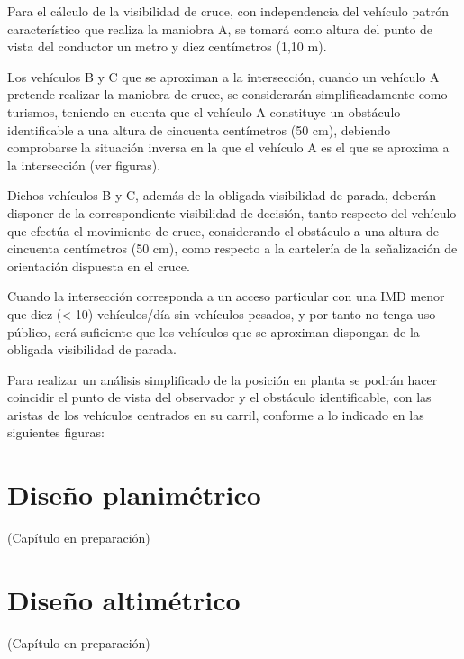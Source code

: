 \documentclass[letterpaper,10pt,english]{sphinxmanual}
\let\sphinxpxdimen\pdfpxdimen\else\newdimen\sphinxpxdimen
\begin{document}
Para el cálculo de la visibilidad de cruce, con independencia del vehículo patrón característico que realiza la maniobra A, se tomará como altura del punto de vista del conductor un metro y diez centímetros (1,10 m).

Los vehículos B y C que se aproximan a la intersección, cuando un vehículo A pretende realizar la maniobra de cruce, se considerarán simplificadamente como turismos, teniendo en cuenta que el vehículo A constituye un obstáculo identificable a una altura de cincuenta centímetros (50 cm), debiendo comprobarse la situación inversa en la que el vehículo A es el que se aproxima a la intersección (ver figuras).

Dichos vehículos B y C, además de la obligada visibilidad de parada, deberán disponer de la correspondiente visibilidad de decisión, tanto respecto del vehículo que efectúa el movimiento de cruce, considerando el obstáculo a una altura de cincuenta centímetros (50 cm), como respecto a la cartelería de la señalización de orientación dispuesta en el cruce.

Cuando la intersección corresponda a un acceso particular con una IMD menor que diez (\textless{} 10) vehículos/día sin vehículos pesados, y por tanto no tenga uso público, será suficiente que los vehículos que se aproximan dispongan de la obligada visibilidad de parada.

Para realizar un análisis simplificado de la posición en planta se podrán hacer coincidir el punto de vista del observador y el obstáculo identificable, con las aristas de los vehículos centrados en su carril, conforme a lo indicado en las siguientes figuras:

\noindent\sphinxincludegraphics[width=800\sphinxpxdimen]{{cruce1}.png}

\noindent\sphinxincludegraphics[width=800\sphinxpxdimen]{{cruce2}.png}

\noindent\sphinxincludegraphics[width=800\sphinxpxdimen]{{cruce3}.png}


\chapter{Diseño planimétrico}
\label{\detokenize{planta:diseno-planimetrico}}\label{\detokenize{planta::doc}}
(Capítulo en preparación)


\chapter{Diseño altimétrico}
\label{\detokenize{alzado:diseno-altimetrico}}\label{\detokenize{alzado::doc}}
(Capítulo en preparación)
\end{document}
